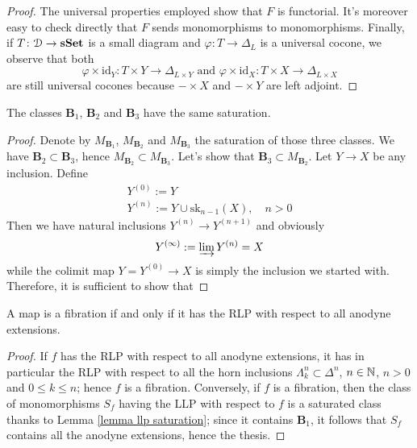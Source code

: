 \begin{refsection}
\begin{proof}
The universal properties employed show that $F$ is functorial. It's moreover easy to check directly that $F$ sends monomorphisms to monomorphisms. Finally, if $T \colon \mathcal D \to \mathbf{sSet}$ is a small diagram and $\varphi \colon T \to \Delta_L$ is a universal cocone, we observe that both
\[
\varphi \times \mathrm{id}_Y \colon T \times Y \to \Delta_{L \times Y} \text{ and } \varphi \times \mathrm{id}_X \colon T \times X \to \Delta_{L \times X}
\]
are still universal cocones because $- \times X$ and $- \times Y$ are left adjoint.
\end{proof}

\begin{thm} \label{thm anodyne extensions}
The classes $\mathbf B_1$, $\mathbf B_2$ and $\mathbf B_3$ have the same saturation.
\end{thm}

\begin{proof}
Denote by $M_{\mathbf B_1}$, $M_{\mathbf B_2}$ and $M_{\mathbf B_3}$ the saturation of those three classes. We have $\mathbf B_2 \subset \mathbf B_3$, hence $M_{\mathbf B_2} \subset M_{\mathbf B_3}$. Let's show that $\mathbf B_3 \subset M_{\mathbf B_2}$. Let $Y \to X$ be any inclusion. Define
\begin{gather*}
Y^{(0)} := Y \\
Y^{(n)} := Y \cup \mathrm{sk}_{n-1}(X), \quad n > 0
\end{gather*}
Then we have natural inclusions $Y^{(n)} \to Y^{(n+1)}$ and obviously
\[
Y^{(\infty)} := \varinjlim Y^{(n)} = X
\]
while the colimit map $Y = Y^{(0)} \to X$ is simply the inclusion we started with. Therefore, it is sufficient to show that 
\end{proof}

\begin{cor}
A map is a fibration if and only if it has the RLP with respect to all anodyne extensions.
\end{cor}

\begin{proof}
If $f$ has the RLP with respect to all anodyne extensions, it has in particular the RLP with respect to all the horn inclusions $\Lambda^n_k \subset \Delta^n$, $n \in \mathbb{N}$, $n > 0$ and $0 \le k \le n$; hence $f$ is a fibration. Conversely, if $f$ is a fibration, then the class of monomorphisms $S_f$ having the LLP with respect to $f$ is a saturated class thanks to Lemma \ref{lemma llp saturation}; since it contains $\mathbf B_1$, it follows that $S_f$ contains all the anodyne extensions, hence the thesis.
\end{proof}


\end{refsection}
